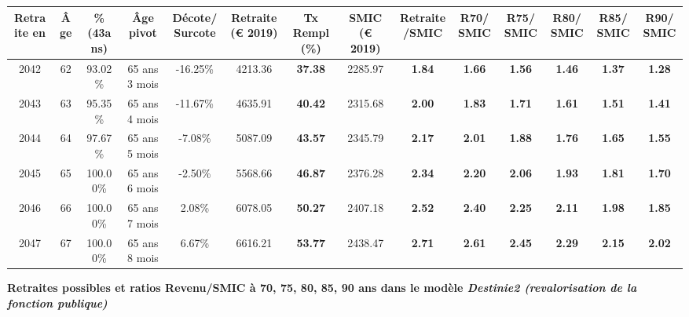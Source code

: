 \begin{adjustbox}{max width=\textwidth} 
\begin{tabular}[htb]{|c|c||c|c|c||c|c||c|c||c|c|c|c|c|} 
\hline 
 Retraite en &  Âge &  \%(43ans) &  Âge pivot &  Décote/Surcote &  Retraite (\euro{} 2019) &  Tx Rempl(\%) &  SMIC (\euro{} 2019) &  Retraite/SMIC &  R70/SMIC &  R75/SMIC &  R80/SMIC &  R85/SMIC &  R90/SMIC \\ 
\hline \hline 
 2042 &  62 &  93.02\% &  65 ans 3 mois &  -16.25\% &  4213.36 &  {\bf 37.38} &  2285.97 &  {\bf 1.84} &  {\bf 1.66} &  {\bf 1.56} &  {\bf 1.46} &  {\bf 1.37} &  {\bf 1.28} \\ 
\hline 
 2043 &  63 &  95.35\% &  65 ans 4 mois &  -11.67\% &  4635.91 &  {\bf 40.42} &  2315.68 &  {\bf 2.00} &  {\bf 1.83} &  {\bf 1.71} &  {\bf 1.61} &  {\bf 1.51} &  {\bf 1.41} \\ 
\hline 
 2044 &  64 &  97.67\% &  65 ans 5 mois &  -7.08\% &  5087.09 &  {\bf 43.57} &  2345.79 &  {\bf 2.17} &  {\bf 2.01} &  {\bf 1.88} &  {\bf 1.76} &  {\bf 1.65} &  {\bf 1.55} \\ 
\hline 
 2045 &  65 &  100.00\% &  65 ans 6 mois &  -2.50\% &  5568.66 &  {\bf 46.87} &  2376.28 &  {\bf 2.34} &  {\bf 2.20} &  {\bf 2.06} &  {\bf 1.93} &  {\bf 1.81} &  {\bf 1.70} \\ 
\hline 
 2046 &  66 &  100.00\% &  65 ans 7 mois &  2.08\% &  6078.05 &  {\bf 50.27} &  2407.18 &  {\bf 2.52} &  {\bf 2.40} &  {\bf 2.25} &  {\bf 2.11} &  {\bf 1.98} &  {\bf 1.85} \\ 
\hline 
 2047 &  67 &  100.00\% &  65 ans 8 mois &  6.67\% &  6616.21 &  {\bf 53.77} &  2438.47 &  {\bf 2.71} &  {\bf 2.61} &  {\bf 2.45} &  {\bf 2.29} &  {\bf 2.15} &  {\bf 2.02} \\ 
\hline 
\hline 
\end{tabular} 
\end{adjustbox} 
 
 \vspace{0.1cm} 
{\bf \noindent Retraites possibles et ratios Revenu/SMIC à 70, 75, 80, 85, 90 ans dans le modèle \emph{Destinie2 (revalorisation de la fonction publique)}}  
 
